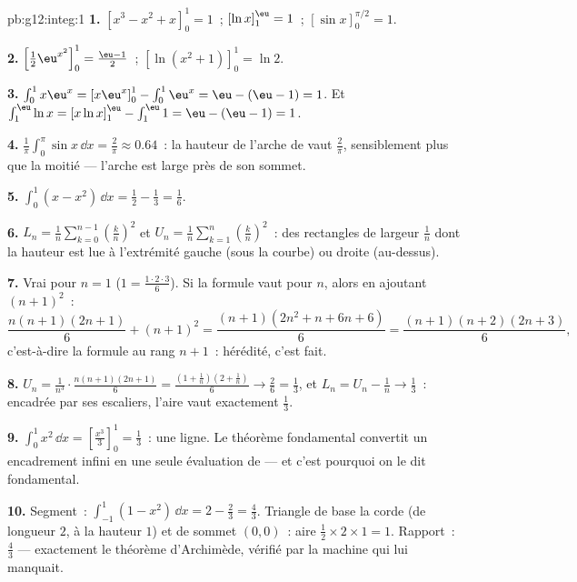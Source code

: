 \begin{solution}{pb:g12:integ:1}
\textbf{1.} $\left[x^3 - x^2 + x\right]_0^1 = 1$~; \quad
$\left[\ln x\right]_1^{\eu} = 1$~; \quad
$\left[\sin x\right]_0^{\pi/2} = 1$.

\textbf{2.} $\left[\frac12 \eu^{x^2}\right]_0^1 =
\frac{\eu - 1}{2}$~; \quad $\left[\ln(x^2 + 1)\right]_0^1 =
\ln 2$.

\textbf{3.} $\int_0^1 x\eu^x = \left[x\eu^x\right]_0^1 -
\int_0^1 \eu^x = \eu - (\eu - 1) = 1$. Et
$\int_1^{\eu} \ln x = \left[x\ln x\right]_1^{\eu} -
\int_1^{\eu} 1 = \eu - (\eu - 1) = 1$.

\textbf{4.} $\frac{1}{\pi}\int_0^\pi \sin x\,\dd x =
\frac{2}{\pi} \approx 0.64$~: la hauteur  de l'arche de
 vaut $\frac2\pi$, sensiblement plus que la moitié --- l'arche
est large près de son sommet.

\textbf{5.} $\int_0^1 (x - x^2)\,\dd x = \frac12 - \frac13 =
\frac16$.

\textbf{6.} $L_n = \frac1n \sum_{k=0}^{n-1}
\left(\frac kn\right)^2$ et
$U_n = \frac1n \sum_{k=1}^{n} \left(\frac kn\right)^2$~: des
rectangles de largeur $\frac1n$ dont la hauteur est lue à
l'extrémité gauche (sous la courbe) ou droite (au-dessus).

\textbf{7.} Vrai pour $n = 1$ ($1 = \frac{1 \cdot 2 \cdot 3}{6}$).
Si la formule vaut pour $n$, alors en ajoutant $(n+1)^2$~:
\[
\frac{n(n+1)(2n+1)}{6} + (n+1)^2
= \frac{(n+1)\left(2n^2 + n + 6n + 6\right)}{6}
= \frac{(n+1)(n+2)(2n+3)}{6},
\]
c'est-à-dire la formule au rang $n + 1$~: hérédité, c'est fait.

\textbf{8.} $U_n = \frac{1}{n^3} \cdot
\frac{n(n+1)(2n+1)}{6} = \frac{(1 + \frac1n)(2 + \frac1n)}{6}
\to \frac26 = \frac13$, et $L_n = U_n - \frac1n \to \frac13$~:
encadrée par ses escaliers, l'aire vaut exactement $\frac13$.

\textbf{9.} $\int_0^1 x^2\,\dd x =
\left[\frac{x^3}{3}\right]_0^1 = \frac13$~: une ligne. Le théorème
fondamental convertit un encadrement infini en une seule évaluation
de  --- et c'est pourquoi on le dit fondamental.

\textbf{10.} Segment~: $\int_{-1}^{1}(1 - x^2)\,\dd x =
2 - \frac23 = \frac43$. Triangle de base la corde (de longueur $2$,
à la hauteur $1$) et de sommet $(0,0)$~: aire
$\frac12 \times 2 \times 1 = 1$. Rapport~: $\frac43$ ---
exactement le théorème d'Archimède, vérifié par la machine qui lui
manquait.


\end{solution}
